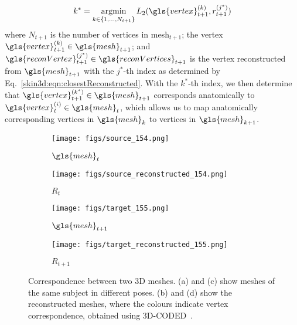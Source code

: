 \documentclass[journal]{IEEEtran}
\DeclareMathOperator*{\argmin}{argmin}
\begin{document}
\begin{equation}
   k^* = \argmin_{k \in \{1, \dots, N_{t+1}\} } L_2(\gls{vertex}_{t+1}^{(k)}, r^{(j^*)}_{t+1})
   \label{skin3d:eqn:closestTarget}
\end{equation}
where $N_{t+1}$ is the number of vertices in \gls{mesh}$_{t+1}$; the vertex $\gls{vertex}^{(k)}_{t+1} \in \gls{mesh}_{t+1}$; and $\gls{reconVertex}^{(j^*)}_{t+1} \in \gls{reconVertices}_{t+1}$ is the vertex reconstructed from $\gls{mesh}_{t+1}$ with the $j^*$-th index as determined by Eq.~\ref{skin3d:eqn:closestReconstructed}. With the $k^*$-th index, we then determine that $\gls{vertex}^{(k^*)}_{t+1} \in \gls{mesh}_{t+1}$ corresponds anatomically to $\gls{vertex}^{(i)}_t \in \gls{mesh}_t$, which allows us to map anatomically corresponding vertices in $\gls{mesh}_k$ to vertices in $\gls{mesh}_{k+1}$.

\begin{figure}[ht]
\centering
\begin{subfigure}[b]{0.24\linewidth}
\texttt{[image: figs/source\_154.png]}
\caption{$\gls{mesh}_t$}
\label{skin3d:fig:source}
\end{subfigure}
\begin{subfigure}[b]{0.24\linewidth}
\texttt{[image: figs/source\_reconstructed\_154.png]}
\caption{$R_t$}
\label{skin3d:fig:source-reconstructed}
\end{subfigure}
\begin{subfigure}[b]{0.24\linewidth}
\texttt{[image: figs/target\_155.png]}
\caption{$\gls{mesh}_{t+1}$}
\label{skin3d:fig:target}
\end{subfigure}
\begin{subfigure}[b]{0.24\linewidth}
\texttt{[image: figs/target\_reconstructed\_155.png]}
\caption{$R_{t+1}$}
\label{skin3d:fig:target-reconstructed}
\end{subfigure}
\caption{Correspondence between two 3D meshes. (a) and (c) show meshes of the same subject in different poses. (b) and (d) show the reconstructed meshes, where the colours indicate vertex correspondence, obtained using 3D-CODED~\citep{Groueix2018}.}
\label{skin3d:fig:bodytex-reconstructed}
\end{figure}
\end{document}
